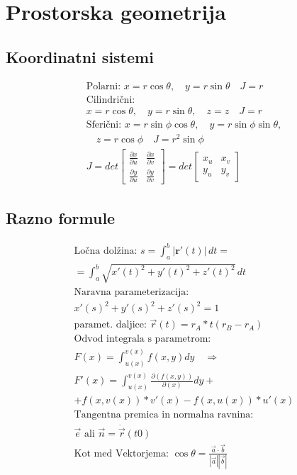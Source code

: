 \documentclass[a4paper,fleqn]{article} %
\begin{document}
\section*{Prostorska geometrija}
\subsection*{Koordinatni sistemi}
\begin{gather*}
    \text{Polarni: } x = r\cos\theta, \quad y = r\sin\theta \quad J = r\\
    \text{Cilindrični: }\\ x = r\cos\theta, \quad y = r\sin\theta, \quad z = z \quad J = r\\
    \text{Sferični: } x = r\sin\phi\cos\theta, \quad y = r\sin\phi\sin\theta,\\
    \quad z = r\cos\phi \quad J = r^2\sin\phi \\
    J = det \begin{bmatrix}
            \frac{\partial x}{\partial u} & \frac{\partial x}{\partial v} \\
            \frac{\partial y}{\partial u} & \frac{\partial y}{\partial v} 
            \end{bmatrix} 
    = det \begin{bmatrix}
            x _u & x _v \\
            y _u & y _v 
            \end{bmatrix} 
\end{gather*}

\subsection*{Razno formule}
\begin{gather*}
    \text{Ločna dolžina: } s = \int_a^b |\mathbf{r}'(t)| \, dt=\\ = \int_a^b \sqrt{x'(t)^2 + y'(t)^2 + z'(t)^2} \, dt \\
    \text{Naravna parameterizacija: } \\ x'(s)^2 + y'(s)^2 + z'(s)^2 = 1 \\
    \text{paramet. daljice: } \vec{r}(t) = r _A * t(r _B - r _ A)\\
    \text{Odvod integrala s parametrom: } \\
    F(x)=\int_{u(x)}^{v(x)} f(x,y)dy \quad \Rightarrow \\
    F'(x)=\int_{u(x)}^{v(x)} \frac{\partial(f(x,y))}{\partial(x)}dy+\\+f(x,v(x))*v'(x)-f(x,u(x))*u'(x) \\
    \text{Tangentna premica in normalna ravnina: } \\ \vec{e}\text{ ali }\vec{n} = \dot\vec{r}(t0) \\
    \text{Kot med Vektorjema: } \cos\theta = \frac{\vec{a}\cdot\vec{b}}{|\vec{a}||\vec{b}|} \\
\end{gather*}
\end{document}
